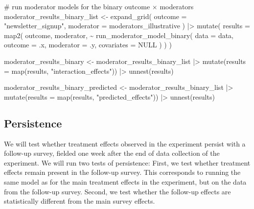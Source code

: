 \documentclass[
  letterpaper,
  DIV=11,
  numbers=noendperiod]{scrartcl}
\newenvironment{Shaded}{\begin{snugshade}}{\end{snugshade}}
\newcommand{\AttributeTok}[1]{\textcolor[rgb]{0.40,0.45,0.13}{#1}}
\newcommand{\CommentTok}[1]{\textcolor[rgb]{0.37,0.37,0.37}{#1}}
\newcommand{\ConstantTok}[1]{\textcolor[rgb]{0.56,0.35,0.01}{#1}}
\newcommand{\FunctionTok}[1]{\textcolor[rgb]{0.28,0.35,0.67}{#1}}
\newcommand{\NormalTok}[1]{\textcolor[rgb]{0.00,0.23,0.31}{#1}}
\newcommand{\OtherTok}[1]{\textcolor[rgb]{0.00,0.23,0.31}{#1}}
\newcommand{\SpecialCharTok}[1]{\textcolor[rgb]{0.37,0.37,0.37}{#1}}
\newcommand{\StringTok}[1]{\textcolor[rgb]{0.13,0.47,0.30}{#1}}
\begin{document}
\begin{Shaded}
\begin{Highlighting}[]
\CommentTok{\# run moderator models for the binary outcome × moderators}
\NormalTok{moderator\_results\_binary\_list }\OtherTok{\textless{}{-}} \FunctionTok{expand\_grid}\NormalTok{(}
  \AttributeTok{outcome   =} \StringTok{"newsletter\_signup"}\NormalTok{,}
  \AttributeTok{moderator =}\NormalTok{ moderators\_illustrative}
\NormalTok{) }\SpecialCharTok{|\textgreater{}}
  \FunctionTok{mutate}\NormalTok{(}
    \AttributeTok{results =} \FunctionTok{map2}\NormalTok{(}
\NormalTok{      outcome, moderator,}
      \SpecialCharTok{\textasciitilde{}} \FunctionTok{run\_moderator\_model\_binary}\NormalTok{(}
          \AttributeTok{data       =}\NormalTok{ data,}
          \AttributeTok{outcome    =}\NormalTok{ .x,}
          \AttributeTok{moderator  =}\NormalTok{ .y,}
          \AttributeTok{covariates =} \ConstantTok{NULL}
\NormalTok{        )}
\NormalTok{    )}
\NormalTok{  )}

\NormalTok{moderator\_results\_binary }\OtherTok{\textless{}{-}}\NormalTok{ moderator\_results\_binary\_list }\SpecialCharTok{|\textgreater{}}
  \FunctionTok{mutate}\NormalTok{(}\AttributeTok{results =} \FunctionTok{map}\NormalTok{(results, }\StringTok{"interaction\_effects"}\NormalTok{)) }\SpecialCharTok{|\textgreater{}}
  \FunctionTok{unnest}\NormalTok{(results)}

\NormalTok{moderator\_results\_binary\_predicted }\OtherTok{\textless{}{-}}\NormalTok{ moderator\_results\_binary\_list }\SpecialCharTok{|\textgreater{}}
  \FunctionTok{mutate}\NormalTok{(}\AttributeTok{results =} \FunctionTok{map}\NormalTok{(results, }\StringTok{"predicted\_effects"}\NormalTok{)) }\SpecialCharTok{|\textgreater{}}
  \FunctionTok{unnest}\NormalTok{(results)}
\end{Highlighting}
\end{Shaded}

\subsection{Persistence}\label{persistence}

We will test whether treatment effects observed in the experiment
persist with a follow-up survey, fielded one week after the end of data
collection of the experiment. We will run two tests of persistence:
First, we test whether treatment effects remain present in the follow-up
survey. This corresponds to running the same model as for the main
treatment effects in the experiment, but on the data from the follow-up
survey. Second, we test whether the follow-up effects are statistically
different from the main survey effects.
\end{document}
